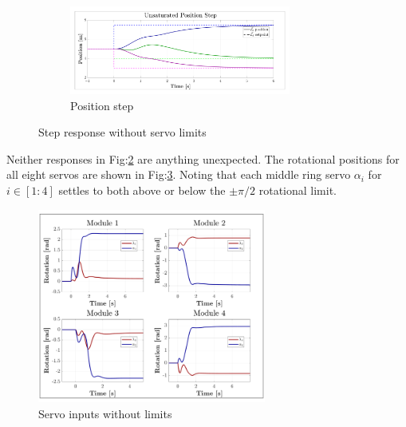 \newpage
\begin{figure}[htbp]
\vspace{-12pt}
\centering
\begin{subfigure}{\textwidth}
\centering
\includegraphics[width=0.8\textwidth]{graphs/unsaturated-position-step}
\vspace{-8pt}
\caption{Position step}
\label{fig:unsaturated-position-step}
\end{subfigure}
\vspace{-10pt}
\caption{Step response without servo limits}
\label{fig:unsaturated-step}
\vspace{-10pt}
\end{figure}
\par
Neither responses in Fig:\ref{fig:unsaturated-step} are anything unexpected. The rotational positions for all eight servos are shown in Fig:\ref{fig:unsaturated-servos}. Noting that each middle ring servo $\alpha_i$ for $i\in[1:4]$ settles to both above or below the $\pm\pi/2$ rotational limit.
\begin{figure}[hbtp]
\vspace{-12pt}
\centering
\includegraphics[width=0.67\textwidth]{graphs/unsaturated-servos}
\vspace{-12pt}
\caption{Servo inputs without limits}
\label{fig:unsaturated-servos}
\vspace{-20pt}
\end{figure}
